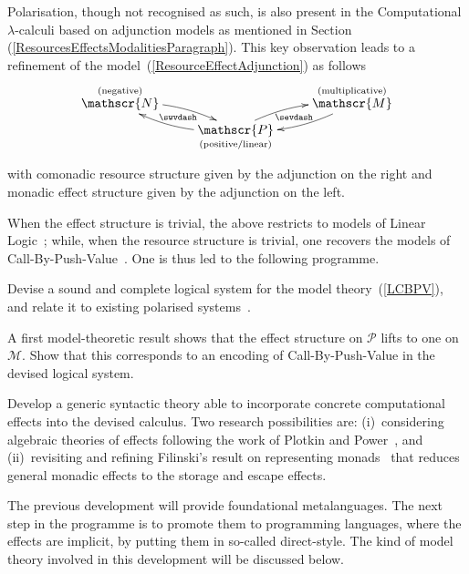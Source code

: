 \documentclass[11pt,twocolumn]{article}
\newcounter{CC}
\newenvironment{resenumerate}
  {\begin{list}{[\textbf{\arabic{CC}]}}
  {\usecounter{CC}
   \setlength{\topsep}{2pt}
   \setlength{\partopsep}{2pt}
   \setlength{\itemsep}{2.5pt}
   \setlength{\parsep}{2.5pt}
   \setlength{\leftmargin}{1.65em}
   \setlength{\labelwidth}{1.15em}
 }}
  {\end{list}}
\newcommand{\hide}[1]{}
\newcommand{\pref}[1]{\,(\ref{#1})}
\newcommand{\cat}[1]{\mathscr{#1}}
\begin{document}
Polarisation, though not recognised as such, is also present in the
Computational \mbox{$\lambda$-calculi} based on adjunction models as mentioned
in Section\pref{ResourcesEffectsModalitiesParagraph}.  This key
observation leads to a refinement of the
model~(\ref{ResourceEffectAdjunction}) as follows
  \begin{equation}\label{LCBPV}
  \begin{minipage}{\columnwidth}
  \xymatrix@R=5pt{
    & & 
    \\
    \ar@{}[u]|-{\text{\scriptsize(negative)}}
    \cat N \ar@/^.75em/[dr] & \ar@{}[rd]|-{\sevdash} \ar@{}[dl]|-{\swvdash} &
    \ar@/^.75em/[dl] \cat M \ar@{}[u]|-{\text{\scriptsize(multiplicative)}}\\
    & \ar@/^.75em/[lu] \cat P \ar@/^.75em/[ur]
    \ar@{}[d]|-{\txt{\scriptsize(positive/linear)}}& 
    \\ & & 
  }
\end{minipage}
\end{equation}
with comonadic resource structure given by the adjunction on the right and
monadic effect structure given by the adjunction on the left.

When the effect structure is trivial, the above restricts to models of Linear
Logic~\cite{MelliesCMLL}; while, when the resource structure is trivial, one
recovers the models of Call-By-Push-Value~\cite{LevyCBPV}.  One is thus led to
the following programme.
\begin{resenumerate}\setcounter{CC}{0}
\item\label{ItemOne}
  Devise a sound and complete logical system for the model
  theory~(\ref{LCBPV}), and relate it to existing polarised
  systems~\cite{Munch,CurienMunch}.
\item
  A first model-theoretic result shows that the effect structure on $\cat
  P$ lifts to one on $\cat M$.  Show that this corresponds to an encoding
  of Call-By-Push-Value in the devised logical system.
\item
  Develop a generic syntactic theory able to incorporate concrete
  computational effects into the devised calculus.  Two research possibilities
  are: (i)~considering algebraic theories of effects following the work of
  Plotkin and Power~\cite{PlotkinPowerAlgOpsAndGenEffs}, and
  (ii)~revisiting and refining Filinski's result on representing
  monads~\cite{Filinski} that reduces general monadic effects to the
  storage and escape effects.  
  \hide{Either of these approaches will necessarily
  have to overcome serious shortcomings.  For instance, on the one hand,
  there is as yet no general operational theory of algebraic effects; and,
  on the other, a logical system for storage is not yet in place.  These
  problems will be investigated.}
\item\label{ItemFour}
  The previous development will provide foundational metalanguages.  The
  next step in the programme is to promote them to programming languages,
  where the effects are implicit, by putting them in so-called
  direct-style.  The kind of model theory involved in this development
  will be discussed below.
\end{resenumerate}
\end{document}
